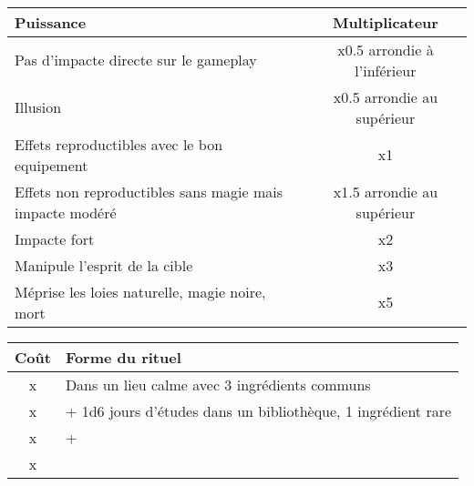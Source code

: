 \documentclass[11pt]{article} %
\newcommand{\myjump}[1][1]{\mbox{}\\[#1cm]}
\begin{document}
\myjump[0.35]\noindent
\begin{tabularx}{\linewidth}{|Xc|}
\hline

    \textbf{Puissance} & \textbf{Multiplicateur}\\
    \hline
    Pas d'impacte directe sur le gameplay & x0.5 arrondie à l'inférieur\\
    Illusion & x0.5 arrondie au supérieur\\
    Effets reproductibles avec le bon equipement & x1\\
    Effets non reproductibles sans magie mais impacte modéré & x1.5 arrondie au supérieur\\
    Impacte fort & x2\\
    Manipule l'esprit de la cible & x3\\
    Méprise les loies naturelle, magie noire, mort & x5\\


\hline
\end{tabularx}


\newpage
\begin{tabularx}{\linewidth}{|cX|}
\hline

    \textbf{Coût} & \textbf{Forme du rituel}\\
    \hline
    x & Dans un lieu calme avec 3 ingrédients communs\\
    x & + 1d6 jours d'études dans un bibliothèque, 1 ingrédient rare\\
    x & + \\
    x & \\


\hline
\end{tabularx}
\end{document}
